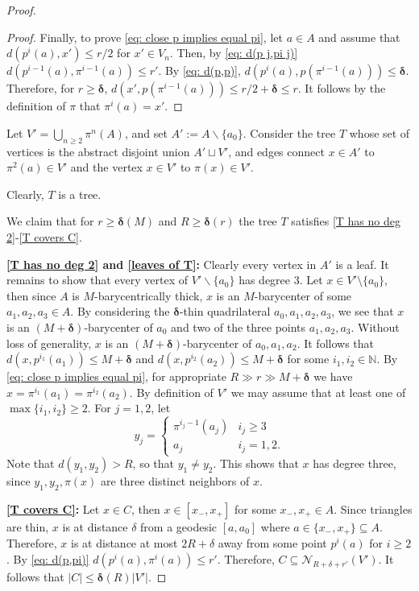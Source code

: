 \documentclass{amsart}
\numberwithin{equation}{section}
\theoremstyle{definition}
\newcommand{\bbN}{\mathbb{N}}
\newcommand{\calN}{\mathcal{N}}
\newcommand{\bdelta}{{\boldsymbol\delta}}
\newcommand{\ssm}{\smallsetminus}
\newcommand{\nir}[1]{\todo[inline, color=magenta]{#1}}
\begin{document}
\begin{proof}
\begin{proof}
        Finally, to prove \eqref{eq: close p implies equal pi}, let $a\in A$ and assume that $d(p^i(a),x')\le r/2$ for $x'\in V_n$. Then, by \eqref{eq: d(p j,pi j)} $d(p^{i-1}(a),\pi ^{i-1}(a))\le r'$. By \eqref{eq: d(p,p)}, $d(p^i(a),p(\pi^{i-1}(a)))\le \bdelta$. Therefore, for $r\ge \bdelta$, $d(x',p(\pi^{i-1}(a)))\le r/2+\bdelta\le r$. 
        It follows by the definition of $\pi$ that $\pi^i(a)=x'$.
    \end{proof}

    Let $V' = \bigcup_{n\ge 2} \pi^n(A)$, and set $A' := A\ssm\{a_0\}$.
    Consider the tree $T$ whose set of vertices is the abstract disjoint union $A'\sqcup V'$, and edges connect $x \in A'$ to $\pi^2(a)\in V'$ and the vertex $x\in V'$ to $\pi(x)\in V'$.
    
    Clearly, $T$ is a tree.

    We claim that for $r\ge \bdelta(M)$ and $R\ge \bdelta(r)$ the tree $T$ satisfies \ref{T has no deg 2}-\ref{T covers C}.

\bigskip

    \noindent\textbf{\ref{T has no deg 2} and \ref{leaves of T}:}
    Clearly every vertex in $A'$ is a leaf. 
    It remains to show that every vertex of $V' \ssm \{a_0\}$ has degree 3.
    Let $x\in V'\setminus \{a_0\}$, then since $A$ is $M$-barycentrically thick, $x$ is an $M$-barycenter of some $a_1,a_2,a_3\in A$. 
    By considering the $\bdelta$-thin quadrilateral $a_0,a_1,a_2,a_3$, we see that $x$ is an $(M+\bdelta)$-barycenter of $a_0$ and two of the three points $a_1,a_2,a_3$. Without loss of generality, $x$ is an $(M+\bdelta)$-barycenter of $a_0,a_1,a_2$.
    It follows that $d(x,p^{i_1}(a_1))\le M+\bdelta$ and $d(x,p^{i_2}(a_2))\le M+\bdelta$ for some $i_1,i_2\in \bbN$.
    By \eqref{eq: close p implies equal pi}, for appropriate $R\gg r\gg M+\bdelta$ we have $x  = \pi^{i_1} (a_1)=\pi^{i_2}(a_2)$.
    By definition of $V'$ we may assume that at least one of $\max\{i_1,i_2\}\ge 2$.
    For $j=1,2$, let $$y_j = \begin{cases} \pi^{i_j-1}(a_j) & i_j\ge 3\\ a_j &i_j =1, 2. \end{cases}$$ 
    Note that $d(y_1,y_2)>R$, so that $y_1\ne y_2$. 
    This shows that $x$ has degree three, since $y_1,y_2,\pi(x)$ are three distinct neighbors of $x$.

    \bigskip

    \noindent \textbf{\ref{T covers C}:} 
    Let $x\in C$, then $x\in [x_-,x_+]$ for some $x_-,x_+\in A$. Since triangles are thin, $x$ is at distance $\delta$ from a geodesic $[a,a_0]$ where $a\in \{x_-,x_+\}\subseteq A$.
Therefore, $x$ is at distance at most $2R+\delta$ away from some point $p^i(a)$ for $i\ge 2$. By \eqref{eq: d(p,pi)} $d(p^i(a),\pi^i(a)) \le r'$. 
Therefore, $C \subseteq \calN_{R+\delta+r'}(V')$.
    It follows that $|C|\le \bdelta(R)|V'| $.
\end{proof}
\end{document}
